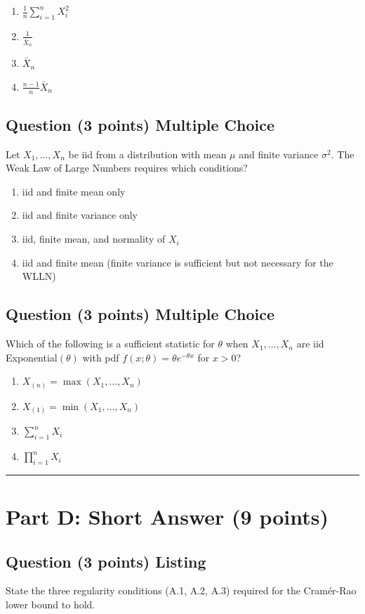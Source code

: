 \documentclass[11pt]{article}
\newcounter{qnum}
\newcommand{\question}[2]{\stepcounter{qnum}\subsection*{Question \theqnum \quad (#1 points) \hfill #2}}
\begin{document}
\begin{enumerate}[label=(\alph*)]
\item $\displaystyle\frac{1}{n}\sum_{i=1}^n X_i^2$
\item $\displaystyle\frac{1}{\bar X_n}$
\item $\displaystyle\bar X_n$
\item $\displaystyle\frac{n-1}{n}\bar X_n$
\end{enumerate}

\question{3}{Multiple Choice}
Let $X_1, \ldots, X_n$ be iid from a distribution with mean $\mu$ and finite variance $\sigma^2$. The Weak Law of Large Numbers requires which conditions?

\begin{enumerate}[label=(\alph*)]
\item iid and finite mean only
\item iid and finite variance only
\item iid, finite mean, and normality of $X_i$
\item iid and finite mean (finite variance is sufficient but not necessary for the WLLN)
\end{enumerate}

\question{3}{Multiple Choice}
Which of the following is a sufficient statistic for $\theta$ when $X_1, \ldots, X_n$ are iid Exponential$(\theta)$ with pdf $f(x;\theta) = \theta e^{-\theta x}$ for $x > 0$?

\begin{enumerate}[label=(\alph*)]
\item $X_{(n)} = \max(X_1, \ldots, X_n)$
\item $X_{(1)} = \min(X_1, \ldots, X_n)$
\item $\displaystyle\sum_{i=1}^n X_i$
\item $\displaystyle\prod_{i=1}^n X_i$
\end{enumerate}

\bigskip
\hrule
\bigskip

\section{Part D: Short Answer \hfill (9 points)}

\question{3}{Listing}
State the three regularity conditions (A.1, A.2, A.3) required for the Cram\'er-Rao lower bound to hold.
\end{document}
